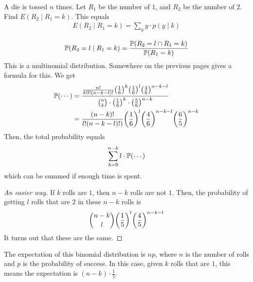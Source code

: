 \begin{example}
    A die is tossed $n$ times. Let $R_1$ be the number of $1$, and $R_2$ be the number of $2$. Find $E(R_2 \mid R_1 = k)$. This equals
    \begin{align}
        E(R_2 \mid R_1 = k) = \sum_y y \cdot p(y \mid k)
    \end{align}
\end{example}
\begin{solution}
    \begin{align}
        \mathbb{P}(R_2 = l \mid R_1 = k) = \frac{\mathbb{P}(R_2 = l \cap R_1 = k)}{\mathbb{P}(R_1 = k)}
    \end{align}
    This is a multinomial distribution. Somewhere on the previous pages gives a formula for this. We get
    \begin{align}
        \mathbb{P}(\cdots) &= \dfrac{\frac{n!}{k!l!(n-k-l)!}\qty(\frac{1}{6})^k \qty(\frac{1}{6})^l \qty(\frac{4}{6})^{n-k-l}}{\binom{n}{k} \cdot \qty(\frac{1}{6})^k \cdot \qty(\frac{5}{6})^{n-k}}\\
        &= \frac{(n-k)!}{l!(n-k-l)!)} \qty(\frac{1}{6})^l \qty(\frac{4}{6})^{n-k-l} \qty(\frac{6}{5})^{n-k}
    \end{align}
    Then, the total probability equals
    \begin{align}
        \sum_{k=0}^{n-k} l \cdot \mathbb{P}(\cdots)
    \end{align}
    which can be summed if enough time is spent.
\end{solution}

\begin{proof}[An easier way]
    If $k$ rolls are $1$, then $n-k$ rolls are not $1$. Then, the probability of getting $l$ rolls that are $2$ in these $n-k$ rolls is
    \begin{align}
        \binom{n-k}{l} \qty(\frac{1}{5})^l \qty(\frac{4}{5})^{n-k-l}
    \end{align}
    It turns out that these are the same.
\end{proof}

The expectation of this binomial distribution is $np$, where $n$ is the number of rolls and $p$ is the probability of success. In this case, given $k$ rolls that are $1$, this means the expectation is $(n-k) \cdot \frac{1}{5}$.

